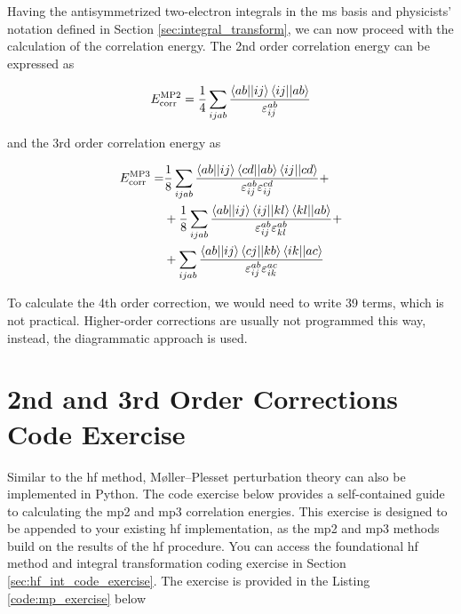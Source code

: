 Having the antisymmetrized two-electron integrals in the \acrshort{ms} basis and physicists' notation defined in Section \ref{sec:integral_transform}, we can now proceed with the calculation of the correlation energy. The 2nd order correlation energy can be expressed as

\begin{equation}
E_{\mathrm{corr}}^{\mathrm{MP2}}=\frac{1}{4}\sum_{ijab}\frac{\braket{ab||ij}\braket{ij||ab}}{\varepsilon_{ij}^{ab}}
\end{equation}

and the 3rd order correlation energy as

\begin{align}
E_{\mathrm{corr}}^{\mathrm{MP3}}=&\frac{1}{8}\sum_{ijab}\frac{\braket{ab||ij}\braket{cd||ab}\braket{ij||cd}}{\varepsilon_{ij}^{ab}\varepsilon_{ij}^{cd}}+\nonumber \\
&+\frac{1}{8}\sum_{ijab}\frac{\braket{ab||ij}\braket{ij||kl}\braket{kl||ab}}{\varepsilon_{ij}^{ab}\varepsilon_{kl}^{ab}}+\nonumber \\
&+\sum_{ijab}\frac{\braket{ab||ij}\braket{cj||kb}\braket{ik||ac}}{\varepsilon_{ij}^{ab}\varepsilon_{ik}^{ac}}
\end{align}

To calculate the 4th order correction, we would need to write 39 terms, which is not practical. Higher-order corrections are usually not programmed this way, instead, the diagrammatic approach is used.\cite{1014569052,10.1016/0010-4655!73!90016-7,10.1016/0010-4655!73!90017-9}

\section{2nd and 3rd Order Corrections Code Exercise}

Similar to the \acrshort{hf} method, Møller--Plesset perturbation theory can also be implemented in Python. The code exercise below provides a self-contained guide to calculating the \acrfull{mp2} and \acrfull{mp3} correlation energies. This exercise is designed to be appended to your existing \acrshort{hf} implementation, as the \acrshort{mp2} and \acrshort{mp3} methods build on the results of the \acrshort{hf} procedure. You can access the foundational \acrshort{hf} method and integral transformation coding exercise in Section \ref{sec:hf_int_code_exercise}. The exercise is provided in the Listing \ref{code:mp_exercise} below

